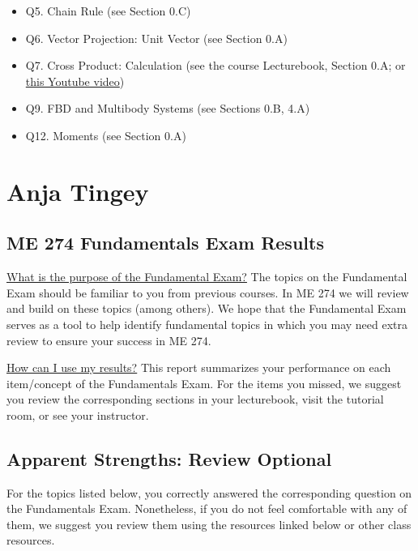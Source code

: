 \documentclass[11pt,letterpaper]{article}\usepackage[]{graphicx}\usepackage[]{color}
\begin{document}
\begin{itemize}\item Q5. Chain Rule (see Section 0.C)
\item Q6. Vector Projection: Unit Vector (see Section 0.A)
\item Q7. Cross Product: Calculation (see the course Lecturebook, Section 0.A; or \href{https://www.youtube.com/watch?v=DmPxjmymM7k}{this Youtube video})
\item Q9. FBD and Multibody Systems (see Sections 0.B, 4.A)
\item Q12. Moments (see Section 0.A)
\end{itemize}

\pagebreak
\section*{Anja Tingey}
\subsection*{ME 274 Fundamentals Exam Results}
\underline{What is the purpose of the Fundamental Exam?}  The topics on the Fundamental Exam should be familiar to you from previous courses.  In ME 274 we will review and build on these topics (among others). We hope that the Fundamental Exam serves as a tool to help identify fundamental topics in which you may need extra review to ensure your success in ME 274.\

\underline{How can I use my results?}  This report summarizes your performance on each item/concept of the Fundamentals Exam.  For the items you missed, we suggest you review the corresponding sections in your lecturebook, visit the tutorial room, or see your instructor.

\subsection*{Apparent Strengths: Review Optional}
For the topics listed below, you correctly answered the corresponding question on the Fundamentals Exam.  Nonetheless, if you do not feel comfortable with any of them, we suggest you review them using the resources linked below or other class resources.
\end{document}
